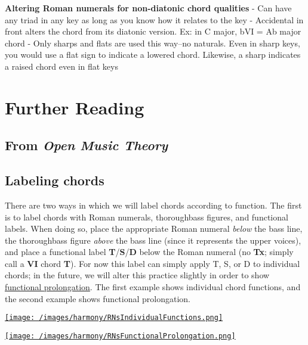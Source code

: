 \documentclass{book}
\begin{document}
\textbf{Altering Roman numerals for non-diatonic chord qualities} - Can have
any triad in any key as long as you know how it relates to the key -
Accidental in front alters the chord from its diatonic version. Ex: in C
major, bVI = Ab major chord - Only sharps and flats are used this way--no
naturals. Even in sharp keys, you would use a flat sign to indicate a lowered
chord. Likewise, a sharp indicates a raised chord even in flat keys

\hypertarget{further-reading-4}{%
\chapter{Further Reading}\label{further-reading-4}}

\hypertarget{from-open-music-theory-5}{%
\section{\texorpdfstring{From \emph{Open Music
Theory}}{From Open Music Theory}}\label{from-open-music-theory-5}}

\hypertarget{labeling-chords}{%
\section{Labeling chords}\label{labeling-chords}}

There are two ways in which we will label chords according to function. The
first is to label chords with Roman numerals, thoroughbass figures, and
functional labels. When doing so, place the appropriate Roman numeral
\emph{below} the bass line, the thoroughbass figure \emph{above} the bass line
(since it represents the upper voices), and place a functional label
\textbf{T}/\textbf{S}/\textbf{D} below the Roman numeral (no \textbf{Tx};
simply call a \textbf{VI} chord \textbf{T}). For now this label can simply
apply T, S, or D to individual chords; in the future, we will alter this
practice slightly in order to show \href{harmonicSyntax2.html}{functional
prolongation}. The first example shows individual chord functions, and the
second example shows functional prolongation.

\href{/images/harmony/RNsIndividualFunctions.png}{\texttt{[image: /images/harmony/RNsIndividualFunctions.png]}}

\href{/images/harmony/RNsFunctionalProlongation.png}{\texttt{[image: /images/harmony/RNsFunctionalProlongation.png]}}
\end{document}

